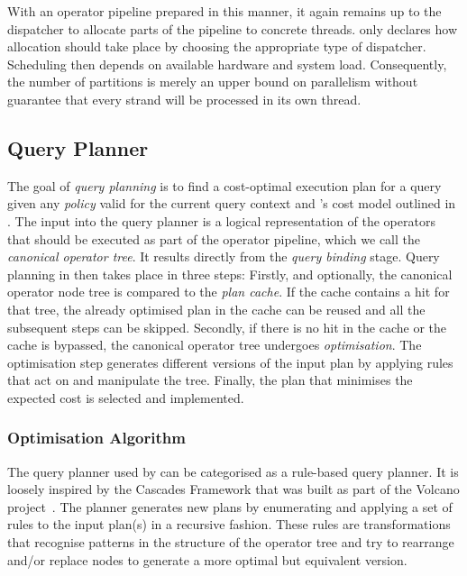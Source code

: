 With an operator pipeline prepared in this manner, it again remains up to the dispatcher to allocate parts of the pipeline to concrete threads. \cottontail{} only declares how allocation should take place by choosing the appropriate type of dispatcher. Scheduling then depends on available hardware and system load. Consequently, the number of partitions is merely an upper bound on parallelism without guarantee that every strand will be processed in its own thread. 

\subsection{Query Planner}
\label{section:cottontail_query_planner}

The goal of \emph{query planning} is to find a cost-optimal execution plan for a query given any \emph{policy} valid for the current query context and \cottontail{}'s cost model outlined in . The input into the query planner is a logical representation of the operators that should be executed as part of the operator pipeline, which we call the \emph{canonical operator tree}. It results directly from the \emph{query binding} stage. Query planning in \cottontail{} then takes place in three steps: Firstly, and optionally, the canonical operator node tree is compared to the \emph{plan cache}. If the cache contains a hit for that tree, the already optimised plan in the cache can be reused and all the subsequent steps can be skipped. Secondly, if there is no hit in the cache or the cache is bypassed, the canonical operator tree undergoes \emph{optimisation}. The optimisation step generates different versions of the input plan by applying rules that act on and manipulate the tree. Finally, the plan that minimises the expected cost is selected and implemented.

\subsubsection{Optimisation Algorithm}

The query planner used by \cottontail{} can be categorised as a rule-based query planner. It is loosely inspired by the Cascades Framework \cite{Graefe:1995Cascades} that was built as part of the Volcano project~\cite{Graefe:1993Volcano}. The planner generates new plans by enumerating and applying a set of rules to the input plan(s) in a recursive fashion. These rules are transformations that recognise patterns in the structure of the operator tree and try to rearrange and/or replace nodes to generate a more optimal but equivalent version.

